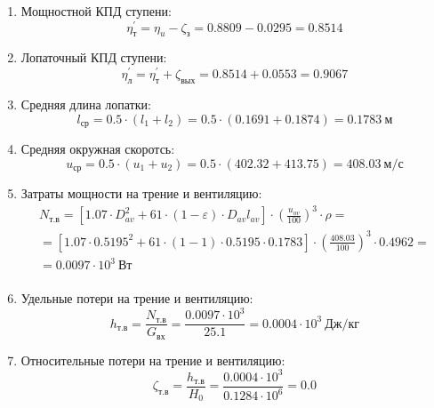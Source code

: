 \documentclass[a4paper,10pt]{article}
\begin{document}
\begin{enumerate}
        \item Мощностной КПД ступени:
        \[
            \eta_т^\prime = \eta_u - \zeta_з =
                0.8809 - 0.0295 = 0.8514
        \]

        \item Лопаточный КПД ступени:
        \[
            \eta_л^\prime = \eta_т^\prime + \zeta_{вых} =
                 0.8514 +  0.0553 =
            0.9067
        \]

        \item Средняя длина лопатки:
        \[
            l_{ср} = 0.5 \cdot (l_1 + l_2) =
                0.5 \cdot (0.1691 + 0.1874) =
            0.1783\ м
        \]

        \item Средняя окружная скоротсь:
        \[
            u_{ср} = 0.5 \cdot (u_1 + u_2) =
                0.5 \cdot (402.32 + 413.75) =
            408.03\ м/с
        \]

        \item Затраты мощности на трение и вентиляцию:
        \begin{gather*}
            N_{т.в} = \left[
                    1.07 \cdot D_{av}^2 + 61 \cdot (1 - \varepsilon) \cdot D_{av} l_{av}
            \right] \cdot
            \left(
                \frac{ u_{av} }{ 100 }
            \right) ^ 3 \cdot
            \rho =\\
            = \left[
                1.07 \cdot 0.5195^2 +
                61 \cdot (1 - 1) \cdot
                0.5195 \cdot 0.1783
            \right] \cdot
            \left(
                \frac{ 408.03 }{ 100 }
            \right) ^ 3 \cdot
            0.4962=\\
            = 0.0097 \cdot 10^3 \ Вт \\
        \end{gather*}

        \item Удельные потери на трение и вентиляцию:
        \[
            h_{т.в} = \frac{ N_{т.в} }{ G_{вх} } =
                \frac{
                    0.0097 \cdot 10^3
                }{
                    25.1
                }
            = 0.0004 \cdot 10^3 \ Дж/кг
        \]

        \item Относительные потери на трение и вентиляцию:
        \[
            \zeta_{т.в} = \frac{ h_{т.в} }{ H_0 } =
                \frac{ 0.0004 \cdot 10^3 }{ 0.1284 \cdot 10^6 } =
            0.0
        \]


\end{enumerate}
\end{document}
